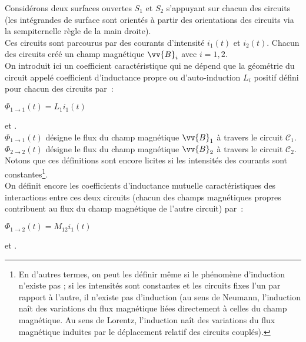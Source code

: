 \documentclass{article}
\newcommand{\mathcolorbox}[2]{\colorbox{#1}{$#2$}}
\renewcommand\overrightarrow{\vv}
\begin{document}
\begin{wrapfigure}{r}{0.25\textwidth}
\caption{}\label{Fig.3}
\end{wrapfigure}



Considérons deux surfaces ouvertes $S_{1}$ et $S_{2}$ s'appuyant sur
chacun des circuits (les intégrandes de surface sont orientés à
partir des orientations des
circuits via la sempiternelle règle de la main droite). \\
Ces circuits sont parcourus par des courants d'intensité $i_{1}(t)$
et $i_{2}(t)$.
Chacun des circuits créé un champ magnétique $\overrightarrow{B}_{i}$ avec $i=1,2$. \\
On introduit ici un coefficient caractéristique qui ne dépend que la
géométrie du circuit appelé coefficient d'inductance propre ou d'auto-induction $L_{i}$  positif défini pour chacun des circuits par : \\
\centerline{\mathcolorbox{gray!20}{\Phi_{1\rightarrow 1}(t) = L_{1}i_{1}(t)}} et
. \\
$\Phi_{\mathrm{1\rightarrow 1}}(t)$ désigne le flux du champ magnétique
$\overrightarrow{B}_{1}$ à travers le circuit $\mathcal{C}_{1}$. \\
$\Phi_{\mathrm{2\rightarrow 2}}(t)$ désigne le flux du champ magnétique
$\overrightarrow{B}_{2}$ à travers le circuit $\mathcal{C}_{2}$. \\
Notons que ces définitions sont encore licites si les intensités des
courants sont constantes\footnote{En d'autres termes, on peut les
définir même si le phénomène d'induction n'existe pas ; si les
intensités sont constantes et les circuits fixes l'un par rapport à
l'autre, il n'existe pas d'induction (au sens de Neumann,
l'induction naît des variations du flux magnétique liées directement
à celles du champ magnétique. Au sens de Lorentz, l'induction naît
des variations du flux magnétique induites par le déplacement
relatif des circuits couplés).}. \\
On définit encore les coefficients d'inductance mutuelle
caractéristiques des interactions entre ces deux circuits (chacun
des champs magnétiques propres contribuent au flux du champ
magnétique de l'autre circuit) par : \\
\centerline{\mathcolorbox{gray!20}{\Phi_{1\rightarrow 2}(t) = M_{12}i_{1}(t)}} et
. \\
\end{document}
